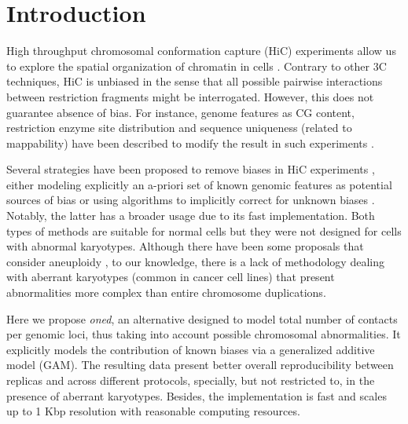 \documentclass{bioinfo}
\begin{document}
\section{Introduction}

High throughput chromosomal conformation capture (HiC) experiments allow us to explore the spatial organization of chromatin in cells \citep{lieberman2009comprehensive}. Contrary to other 3C techniques, HiC is unbiased in the sense that all possible pairwise interactions between restriction fragments might be interrogated. However, this does not guarantee absence of bias. For instance, genome features as CG content, restriction enzyme site distribution and sequence uniqueness (related to mappability) have been described to modify the result in such experiments \citep{yaffe2011probabilistic}.

Several strategies have been proposed to remove biases in HiC experiments \citep{schmitt2016genome}, either modeling explicitly an a-priori set of known genomic features as potential sources of bias \citep{yaffe2011probabilistic,hu2012hicnorm} or using algorithms to implicitly correct for unknown biases \citep{imakaev2012iterative}. Notably, the latter has a broader usage due to its fast implementation. Both types of methods are suitable for normal cells but they were not designed for cells with abnormal karyotypes. Although there have been some proposals that consider aneuploidy \citep{wu2016computational}, to our knowledge, there is a lack of methodology dealing with aberrant karyotypes (common in cancer cell lines) that present abnormalities more complex than entire chromosome duplications.

Here we propose \textit{oned}, an alternative designed to model total number of contacts per genomic loci, thus taking into account possible chromosomal abnormalities. It explicitly models the contribution of known biases via a generalized additive model (GAM). The resulting data present better overall reproducibility between replicas and across different protocols, specially, but not restricted to, in the presence of aberrant karyotypes. Besides, the implementation is fast and scales up to 1 Kbp resolution with reasonable computing resources.

\end{document}
